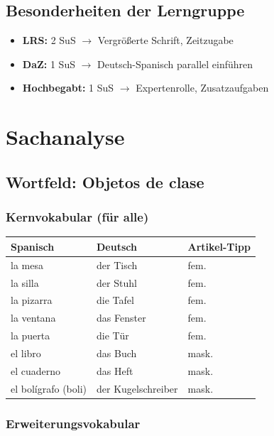 \documentclass[11pt,a4paper]{article}
\begin{document}
\subsection{Besonderheiten der Lerngruppe}
\begin{itemize}
    \item \textbf{LRS:} 2 SuS $\rightarrow$ Vergrößerte Schrift, Zeitzugabe
    \item \textbf{DaZ:} 1 SuS $\rightarrow$ Deutsch-Spanisch parallel einführen
    \item \textbf{Hochbegabt:} 1 SuS $\rightarrow$ Expertenrolle, Zusatzaufgaben
\end{itemize}

\section{Sachanalyse}

\subsection{Wortfeld: Objetos de clase}

\subsubsection{Kernvokabular (für alle)}

\begin{center}
\begin{tabular}{|l|l|l|}
\hline
\textbf{Spanisch} & \textbf{Deutsch} & \textbf{Artikel-Tipp} \\
\hline
la mesa & der Tisch & fem. \\
la silla & der Stuhl & fem. \\
la pizarra & die Tafel & fem. \\
la ventana & das Fenster & fem. \\
la puerta & die Tür & fem. \\
el libro & das Buch & mask. \\
el cuaderno & das Heft & mask. \\
el bolígrafo (boli) & der Kugelschreiber & mask. \\
\hline
\end{tabular}
\end{center}

\subsubsection{Erweiterungsvokabular}
\end{document}
